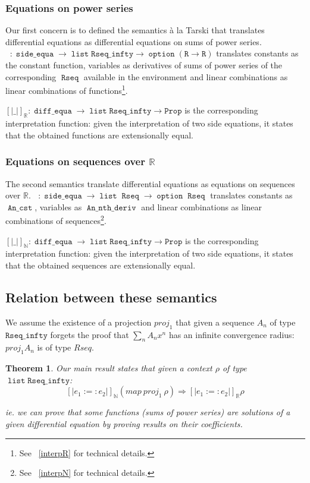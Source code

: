 \documentclass{article}
\newcommand{\Prop}{\texttt{Prop}}
\newcommand{\N}{\mathbb{N}}
\newcommand{\R}{\mathbb{R}}
\DeclareMathOperator{\Rseq}{\mathtt{Rseq}}
\DeclareMathOperator{\option}{\mathtt{option}}
\DeclareMathOperator{\alist}{\mathtt{list}}
\DeclareMathOperator{\de}{\mathtt{diff\_equa}}
\DeclareMathOperator{\se}{\mathtt{side\_equa}}
\DeclareMathOperator{\Interp}{\mathtt{interp}}
\DeclareMathOperator{\IR}{\Interp_{\R}}
\DeclareMathOperator{\IN}{\Interp_{\N}}
\DeclareMathOperator{\C}{\mathtt{An\_cst}}
\DeclareMathOperator{\Dn}{\mathtt{An\_nth\_deriv}}
\newtheorem{theorem}{Theorem}
\begin{document}
\subsubsection{Equations on power series}

Our first concern is to defined the semantics \`a la Tarski that translates
differential equations as differential equations on sums of power series.
$\IR : \se \rightarrow \alist{} \mathtt{Rseq\_infty} \rightarrow \option{}
(\texttt{R} \rightarrow \texttt{R})$ translates constants as the constant function,
variables as derivatives of sums of power series of the corresponding $\Rseq$
available in the environment and linear combinations as linear combinations of
functions\footnote{See ~\ref{interpR} for technical details.}.

$\left[\left| \_ \right|\right]_{\R} : \de \rightarrow \alist{}
\mathtt{Rseq\_infty} \rightarrow \Prop$ is the corresponding interpretation
function: given the interpretation of two side equations, it states that the
obtained functions are extensionally equal.


\subsubsection{Equations on sequences over $\R$}

The second semantics translate differential equations as equations on sequences
over $\R$. $\IN : \se \rightarrow \alist{} \Rseq \rightarrow
\option{} \Rseq$ translates constants as $\C{}$, variables as $\Dn{}$ and linear
combinations as linear combinations of sequences\footnote{See ~\ref{interpN} for
technical details.}.

$\left[\left| \_ \right|\right]_{\N} : \de \rightarrow \alist{}
\mathtt{Rseq\_infty} \rightarrow \Prop$ is the corresponding interpretation
function:  given the interpretation of two side equations, it states that the
obtained sequences are extensionally equal.

\subsection{Relation between these semantics}

We assume the existence of a projection $proj_1$ that given a sequence $A_n$ of
type $\mathtt{Rseq\_infty}$ forgets the proof that $\sum_n A_n x^n$ has an
infinite convergence radius: $proj_1 A_n$ is of type $Rseq$.

\begin{theorem}Our main result states that given a context
$\rho$ of type $\alist{} \mathtt{Rseq\_infty}$:
$$\left[\left| e_1 :=: e_2 \right|\right]_\N (map ~ proj_1 ~ \rho) \Rightarrow
\left[\left| e_1 :=: e_2 \right|\right]_\R \rho$$

ie. we can prove that some functions (sums of power series) are solutions
of a given differential equation by proving results on their coefficients.
\end{theorem}
\end{document}
